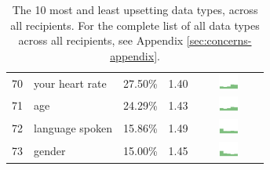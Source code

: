 \begin{table}[t]
\begin{center}
\begin{tabular}{| r | l | r | r |c |}
70 & your heart rate & 27.50\% & 1.40 & \includegraphics[width = 2cm, height = 0.5cm]{tex-inputs/data10/learnedyourheartratecombined} \\
71 & age & 24.29\% & 1.43 & \includegraphics[width = 2cm, height = 0.5cm]{tex-inputs/data10/learnedyouragecombined}\\
72 & language spoken & 15.86\% & 1.49 & \includegraphics[width = 2cm, height = 0.5cm]{tex-inputs/data10/learnedthelanguageyouwerespeakingcombined}\\
73 & gender & 15.00\% & 1.45 & \includegraphics[width = 2cm, height = 0.5cm]{tex-inputs/data10/learnedyourgendercombined}\\ 
\hline
\end{tabular}
\caption{The 10 most and least upsetting data types, across all recipients. For the complete list of all data types across all recipients, see Appendix \ref{sec:concerns-appendix}.}
\label{top10-table}
\end{center}
\end{table}











